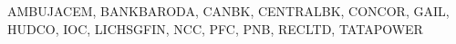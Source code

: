 AMBUJACEM, BANKBARODA, CANBK, CENTRALBK, CONCOR, GAIL, HUDCO, IOC, LICHSGFIN, NCC, PFC, PNB, RECLTD, TATAPOWER
